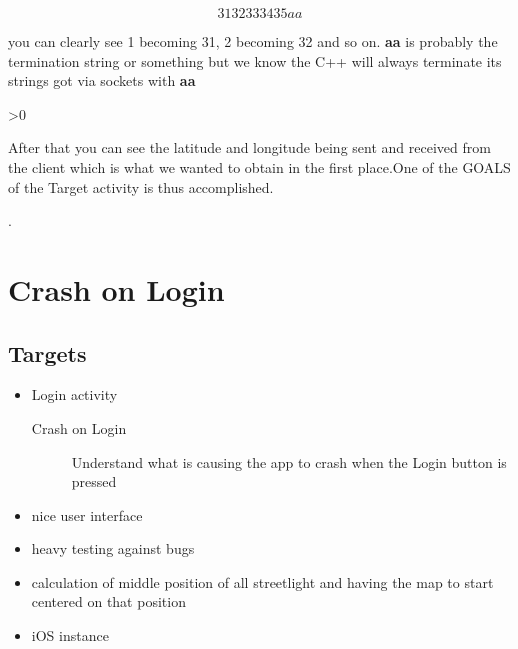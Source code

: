 \documentclass[a4paper,12pt]{book}
\makeatletter
\newcommand{\wrapfill}{\par\ifnum\value{WF@wrappedlines}>0
  \addtocounter{WF@wrappedlines}{-1}%
  \null\vspace{\arabic{WF@wrappedlines}\baselineskip}%
  \WFclear
\fi}
\makeatother
\begin{document}
\[ 3132333435aa \]

\noindent you can clearly see 1 becoming 31, 2 becoming 32 and so on. \textbf{aa} is probably the termination string or something but we know the C++ will always terminate its strings got via sockets with \textbf{aa}

\wrapfill


\noindent After that you can see the latitude and longitude being sent and received from the client which is what we wanted to obtain in the first place.One of the GOALS of the Target activity is thus accomplished.





\clearpage
. 
\bigskip
\bigskip
\bigskip
\bigskip
\bigskip
\bigskip
\bigskip
\bigskip
\bigskip
\bigskip
\bigskip
\bigskip
\bigskip
\bigskip
\bigskip
\medskip
\medskip
\medskip
\section{\scalebox{1.5}Crash on Login}




\subsection{Targets}

\begin{itemize}
\item{Login activity}
   \begin{description}
   \item[]{}
   \item[Crash on Login]{Understand what is causing the app to crash when the Login button is pressed}
   \end{description}
\item{nice user interface}
\item{heavy testing against bugs}
\item{calculation of middle position of all streetlight and having the map to start centered on that position}
\item{iOS instance}
\end{itemize}
\end{document}
